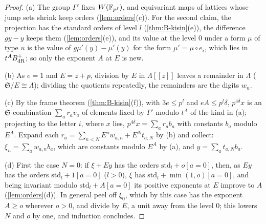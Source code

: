 \begin{proof}
(a) The group $\Gamma'$ fixes $W(\mathbb{F}_{p^f})$, and equivariant maps of lattices whose jump sets shrink keep orders (\cref{lem:orders}(c)). For the second claim, the projection has the standard orders of level $l$ (\cref{thm:B-kisin}(e)), the difference $gy-y$ keeps them (\cref{lem:orders}(e)), and its value at the level $0$ under a form $\mu$ of type $u$ is the
value of $g\mu'(y)-\mu'(y)$ for the form $\mu'=\mu\circ e_i$, which lies in $t^AB_{\rm dR}^+$; so only the exponent $A$ at $E$ is new.

(b) As $e=1$ and $E=z+p$, division by $E$ in $\Lambda[\![z]\!]$ leaves a remainder in $\Lambda$ ($\mathfrak S/E\cong\Lambda$); dividing the quotients repeatedly, the remainders are the digits $w_n$.

(c) By the frame theorem (\cref{thm:B-kisin}(f)), with $3e\le p^l$ and $eA\le p^l\delta$, $p^{4\delta}x$ is an $\mathfrak S$-combination $\sum_ar_av_a$ of elements fixed by $\Gamma'$ modulo $t^A$ of the kind in (a); projecting to the letter $i$, where $x$ lies, $p^{4\delta}x=\sum_ar_ab_a$ with constants $b_a$ modulo $E^A$.
Expand each $r_a=\sum_{n<N}E^nw_{a,n}+E^Nt_{a,N}$ by (b) and collect: $\xi_n=\sum_aw_{a,n}b_a$, which are constants modulo $E^A$ by (a), and $y=\sum_at_{a,N}b_a$.

(d) First the case $N=0$: if $\xi+Ey$ has the orders $\mathrm{std}_l+o[a=0]$, then, as $Ey$ has the orders $\mathrm{std}_l+1[a=0]$ ($l>0$), $\xi$ has $\mathrm{std}_l+\min(1,o)[a=0]$, and being invariant modulo $\mathrm{std}_l+A[a=0]$ its positive exponents at $E$ improve to $A$ (\cref{lem:orders}(d)). In general
peel off $\xi_0$, which by this case has the exponent $A\ge o$ wherever $o>0$, and divide by $E$, a unit away from the level $0$; this lowers $N$ and $o$ by one, and induction concludes.


\end{proof}
